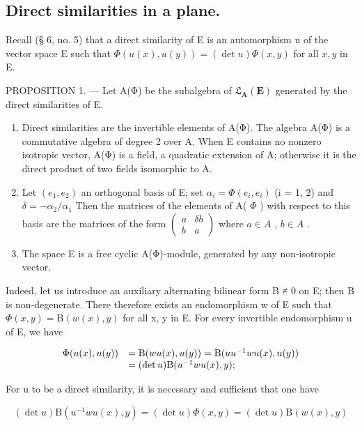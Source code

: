 \subsection{Direct similarities in a plane.}

Recall (§ 6, no. 5) that a direct similarity of E is an automorphism u of the vector space E such that \(\Phi(u(x), u(y)) = (\det u)\Phi(x, y)\) for all \(x, y\) in E.

PROPOSITION 1. --- Let A(Φ) be the subalgebra of \(\mathfrak{L}_{\mathbf{A}}(\mathbf{E})\) generated by the direct similarities of E.

\begin{enumerate}
\def\labelenumi{\alph{enumi})}
\item
  Direct similarities are the invertible elements of A(Φ). The algebra A(Φ) is a commutative algebra of degree 2 over A. When E contains no nonzero isotropic vector, A(Φ) is a field, a quadratic extension of A; otherwise it is the direct product of two fields isomorphic to A.
\item
  Let \((e_{1}, e_{2})\) an orthogonal basis of E; set \(\alpha_{i} = \Phi(e_{i}, e_{i})\) (i = 1, 2) and \(\delta = -\alpha_{2}/\alpha_{1}\) Then the matrices of the elements of A( \(\Phi\) ) with respect to this basis are the matrices of the form \(\begin{pmatrix} a & \delta b \\ b & a \end{pmatrix}\) where \(a \in A\) , \(b \in A\) .
\item
  The space E is a free cyclic A(Φ)-module, generated by any non-isotropic vector.
\end{enumerate}

Indeed, let us introduce an auxiliary alternating bilinear form B ≠ 0 on E; then B is non-degenerate. There therefore exists an endomorphism w of E such that \(\Phi(x, y) = \mathrm{B}(w(x), y)\) for all x, y in E. For every invertible endomorphism u of E, we have

\[
\begin{array}{r l} \Phi (u (x), u (y)) & = \mathrm{B} (w u (x), u (y)) = \mathrm{B} (u u ^ {- 1} w u (x), u (y)) \\ & = (\det u) \mathrm{B} (u ^ {- 1} w u (x), y); \end{array}
\]

For u to be a direct similarity, it is necessary and sufficient that one have

\[
(\det u) \mathrm{B} (u ^ {- 1} w u (x), y) = (\det u) \Phi (x, y) = (\det u) \mathrm{B} (w (x), y)
\]

